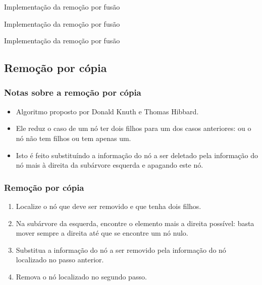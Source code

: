 \begin{frame}[fragile]{Implementação da remoção por fusão}
\end{frame}

\begin{frame}[fragile]{Implementação da remoção por fusão}
\end{frame}

\begin{frame}[fragile]{Implementação da remoção por fusão}
\end{frame}

\subsection{Remoção por cópia}
\begin{frame}

	\frametitle{Notas sobre a remoção por cópia}

	\begin{itemize}
		\item Algoritmo proposto por { Donald Knuth} e { Thomas Hibbard}.

		\item Ele reduz o caso de um nó ter { dois} filhos para um dos casos anteriores: ou o nó { não tem} 
		filhos ou tem apenas { um}.

		\item Isto é feito { substituíndo} a informação do nó a ser deletado pela informação do nó mais à 
		{ direita} da subárvore { esquerda} e apagando { este nó}.
	\end{itemize}
\end{frame}


\begin{frame}

	\frametitle{Remoção por cópia}

	\begin{enumerate}
		\item Localize o nó que deve ser { removido} e que tenha { dois} filhos.

		\item Na subárvore da { esquerda}, encontre o elemento mais a { direita} possível: basta mover sempre 
			a direita até que se encontre um nó { nulo}.

		\item { Substitua} a informação do nó { a ser removido} pela informação do nó localizado no { passo 
		anterior}.

		\item { Remova} o nó localizado no { segundo passo}.
	\end{enumerate}

\end{frame}  

%
